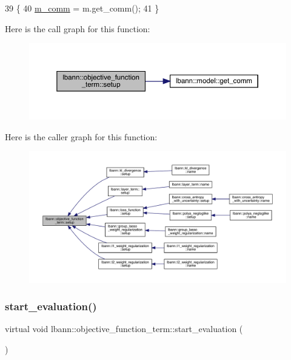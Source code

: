 \begin{DoxyCode}
39                                             \{
40   \hyperlink{classlbann_1_1objective__function__term_a591367c1f2eac887c0f7426335265345}{m\_comm} = m.get\_comm();
41 \}
\end{DoxyCode}
Here is the call graph for this function\+:\nopagebreak
\begin{figure}[H]
\begin{center}
\leavevmode
\includegraphics[width=350pt]{classlbann_1_1objective__function__term_a6c8dbdf18aac8676098189fb7b178e91_cgraph}
\end{center}
\end{figure}
Here is the caller graph for this function\+:\nopagebreak
\begin{figure}[H]
\begin{center}
\leavevmode
\includegraphics[width=350pt]{classlbann_1_1objective__function__term_a6c8dbdf18aac8676098189fb7b178e91_icgraph}
\end{center}
\end{figure}
\mbox{\label{classlbann_1_1objective__function__term_a0af4dfd71fb30e43d1ae7611172ad9b0}} 
\subsubsection{\texorpdfstring{start\+\_\+evaluation()}{start\_evaluation()}}
{\footnotesize\ttfamily virtual void lbann\+::objective\+\_\+function\+\_\+term\+::start\+\_\+evaluation (\begin{DoxyParamCaption}{ }\end{DoxyParamCaption})\hspace{0.3cm}{\ttfamily [pure virtual]}}


